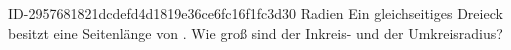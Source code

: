 \begin{exercise}
      {ID-2957681821dcdefd4d1819e36ce6fc16f1fc3d30}
      {Radien}
  \ifproblem\problem
    Ein gleichseitiges Dreieck besitzt eine Seitenlänge von .
    Wie groß sind der Inkreis- und der Umkreisradius?
  \fi
\end{exercise}

